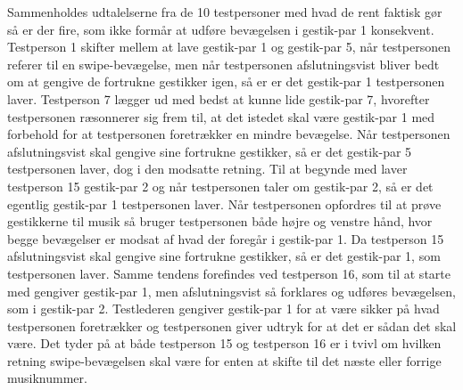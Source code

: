 Sammenholdes udtalelserne fra de 10 testpersoner med hvad de rent faktisk gør så er der fire, som ikke formår at udføre bevægelsen i gestik-par 1 konsekvent. Testperson 1 skifter mellem at lave gestik-par 1 og gestik-par 5, når testpersonen referer til en swipe-bevægelse, men når testpersonen afslutningsvist bliver bedt om at gengive de fortrukne gestikker igen, så er er det gestik-par 1 testpersonen laver. Testperson 7 lægger ud med bedst at kunne lide gestik-par 7, hvorefter testpersonen ræsonnerer sig frem til, at det istedet skal være gestik-par 1 med forbehold for at testpersonen foretrækker en mindre bevægelse. Når testpersonen afslutningsvist skal gengive sine fortrukne gestikker, så er det gestik-par 5 testpersonen laver, dog i den modsatte retning. Til at begynde med laver testperson 15 gestik-par 2 og når testpersonen taler om gestik-par 2, så er det egentlig gestik-par 1 testpersonen laver. Når testpersonen opfordres til at prøve gestikkerne til musik så bruger testpersonen både højre og venstre hånd, hvor begge bevægelser er modsat af hvad der foregår i gestik-par 1. Da testperson 15 afslutningsvist skal gengive sine fortrukne gestikker, så er det gestik-par 1, som testpersonen laver. Samme tendens forefindes ved testperson 16, som til at starte med gengiver gestik-par 1, men afslutningsvist så forklares og udføres bevægelsen, som i gestik-par 2. Testlederen gengiver gestik-par 1 for at være sikker på hvad testpersonen foretrækker og testpersonen giver udtryk for at det er sådan det skal være. Det tyder på at både testperson 15 og testperson 16 er i tvivl om hvilken retning swipe-bevægelsen skal være for enten at skifte til det næste eller forrige musiknummer. 

